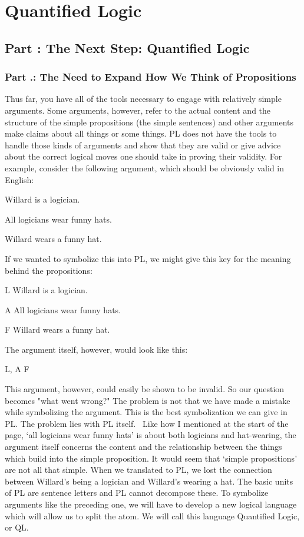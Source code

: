 \part{Quantified Logic}
\label{ch.qlsymbolizing}
\setcounter{seccount}{1}
\chapter{Part \thechapcount: The Next Step: Quantified Logic}
\section{Part \thechapcount.\theseccount: The Need to Expand How We Think of Propositions}
\setcounter{Example}{0}
Thus far, you have all of the tools necessary to engage with relatively simple arguments. Some arguments, however, refer to the actual content and the structure of the simple propositions (the simple sentences) and other arguments make claims about all things or some things. PL does not have the tools to handle those kinds of arguments and show that they are valid or give advice about the correct logical moves one should take in proving their validity. For example, consider the following argument, which should be obviously valid in English:
\begin{earg}
\item[]Willard is a logician.
\item[]All logicians wear funny hats.
\item[\therefore]  Willard wears a funny hat.
\end{earg}
If we wanted to symbolize this into PL, we might give this key for the meaning behind the propositions: 
\begin{ekey}
\item[L] Willard is a logician.
\item[A] All logicians wear funny hats.
\item[F] Willard wears a funny hat.
\end{ekey}
The argument itself, however, would look like this:
\begin{center}
L, A \therefore  F
\end{center}
This argument, however, could easily be shown to be invalid. So our question becomes "what went wrong?" The problem is not that we have made a mistake while symbolizing the argument. This is the best symbolization we can give in PL. The problem lies with PL itself.  Like how I mentioned at the start of the page, ‘all logicians wear funny hats’ is about both logicians and hat-wearing, the argument itself concerns the content and the relationship between the things which build into the simple proposition. It would seem that ‘simple propositions' are not all that simple. When we translated to PL, we lost the connection between Willard’s being a logician and Willard’s wearing a hat. The basic units of PL are sentence letters and PL cannot decompose these. To symbolize arguments like the preceding one, we will have to develop a new logical language which will allow us to split the atom. We will call this language Quantified Logic, or QL.

